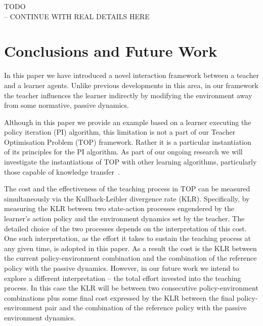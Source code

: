 \documentclass[letterpaper]{aamas2010}
\begin{document}
{\Large TODO\\ -- CONTINUE WITH REAL DETAILS HERE}

\section{Conclusions and Future Work}\label{sec: future work}

In this paper we have introduced a novel interaction framework between
a teacher and a learner agents. Unlike previous developments in this
area, in our framework the teacher influences the learner indirectly by
modifying the environment away from some normative, passive
dynamics. 

Although in this paper we provide an example based on a learner
executing the policy iteration (PI) algorithm, this limitation is not
a part of our Teacher Optimisation Problem (TOP) framework. Rather it
is a particular instantiation of its principles for the PI
algorithm. As part of our ongoing research we will investigate the
instantiations of TOP with other learning algorithms, particularly
those capable of knowledge transfer~\cite{taylor_stone_2009,taylor_PhD_2008}.

The cost and the effectiveness of the teaching process in TOP can
be measured simultaneously via the Kullback-Leibler divergence rate
(KLR). Specifically, by measuring the KLR between two state-action
processes engendered by the learner's action policy and the
environment dynamics set by the teacher. The detailed choice of the
two processes depends on the interpretation of this cost. One such
interpretation, as the effort it takes to sustain the teaching process
at any given time, is adopted in this paper. As a result the cost is
the KLR between the current policy-environment combination and the
combination of the reference policy with the passive
dynamics. However, in our future work we intend to explore a different
interpretation -- the total effort invested into the teaching
process. In this case the KLR will be between two consecutive
policy-environment combinations plus some final cost expressed by the
KLR between the final policy-environment pair and the combination of
the reference policy with the passive environment dynamics. 





\end{document}
